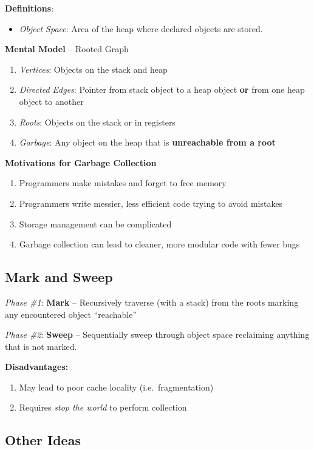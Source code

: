 \documentclass[10pt,twocolumn]{report}
\begin{document}
\textbf{Definitions}:

\begin{itemize}
  \item \textit{Object Space}: Area of the heap where declared objects are stored.
\end{itemize}

\textbf{Mental Model} -- Rooted Graph
\begin{enumerate}
  \item \textit{Vertices}: Objects on the stack and heap
  \item \textit{Directed Edges}: Pointer from stack object to a heap object \textbf{or} from one heap object to another
  \item \textit{Roots}: Objects on the stack or in registers
  \item \textit{Garbage}: Any object on the heap that is \textbf{unreachable from a root}
\end{enumerate}

\textbf{Motivations for Garbage Collection}
\begin{enumerate}
  \item Programmers make mistakes and forget to free memory
  \item Programmers write messier, less efficient code trying to avoid mistakes
  \item Storage management can be complicated
  \item Garbage collection can lead to cleaner, more modular code with fewer bugs
\end{enumerate}

\subsection*{Mark and Sweep}
\textit{Phase \#1}: \textbf{Mark} -- Recursively traverse (with a stack) from the roots marking any encountered object ``reachable''

\textit{Phase \#2}: \textbf{Sweep} -- Sequentially sweep through object space reclaiming anything that is not marked.

\textbf{Disadvantages:}
\begin{enumerate}
  \item May lead to poor cache locality (i.e.\ fragmentation)
  \item Requires \textit{stop the world} to perform collection
\end{enumerate}

\subsection*{Other Ideas}
\end{document}
